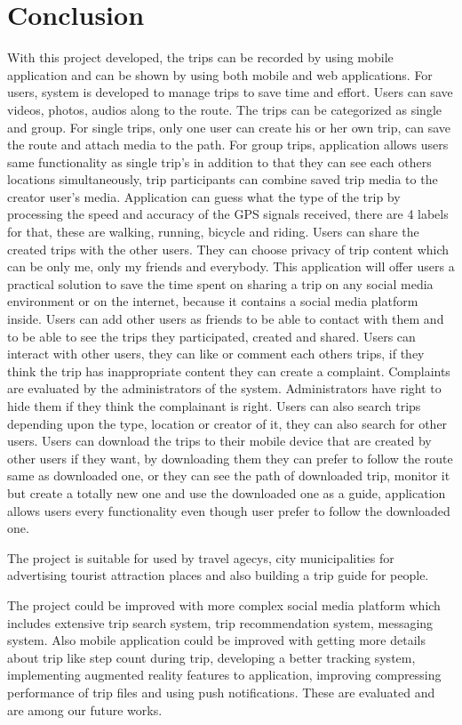 \chapter{Conclusion}

	With this project developed, the trips can be recorded by using mobile application and can be shown by using both mobile and web applications. For users, system is developed to manage trips to save time and effort. Users can save videos, photos, audios along to the route. The trips can be categorized as single and group. For single trips, only one user can create his or her own trip, can save the route and attach media to the path. For group trips, application allows users same functionality as single trip's in addition to that they can see each others locations simultaneously, trip participants can combine saved trip media to the creator user's media. Application can guess what the type of the trip by processing the speed and accuracy of the GPS signals received, there are 4 labels for that, these are walking, running, bicycle and riding. Users can share the created trips with the other users. They can choose privacy of trip content which can be only me, only my friends and everybody. This application will offer users a practical solution to save the time spent on sharing a trip on any social media environment or on the internet, because it contains a social media platform inside. Users can add other users as friends to be able to contact with them and to be able to see the trips they participated, created and shared. Users can interact with other users, they can like or comment each others trips, if they think the trip has inappropriate content they can create a complaint. Complaints are evaluated by the administrators of the system. Administrators have right to hide them if they think the complainant is right. Users can also search trips depending upon the type, location or creator of it, they can also search for other users. Users can download the trips to their mobile device that are created by other users if they want, by downloading them they can prefer to follow the route same as downloaded one, or they can see the path of downloaded trip, monitor it but create a totally new one and use the downloaded one as a guide, application allows users every functionality even though user prefer to follow the downloaded one.

	The project is suitable for used by travel agecys, city municipalities for advertising tourist attraction places and also building a trip guide for people.

	The project could be improved with more complex social media platform which includes extensive trip search system, trip recommendation system, messaging system. Also mobile application could be improved with getting more details about trip like step count during trip, developing a better tracking system, implementing augmented reality features to application, improving compressing performance of trip files and using push notifications. These are evaluated and are among our future works.

